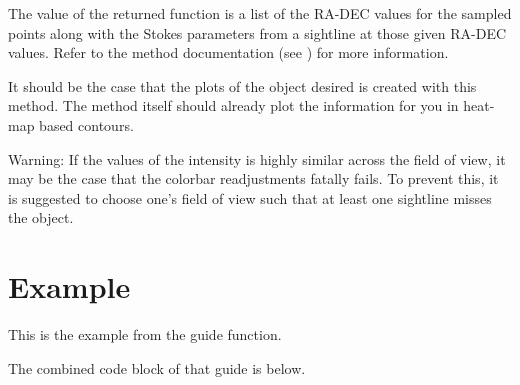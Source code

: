\documentclass[letterpaper,10pt,english]{sphinxmanual}
\begin{document}
The value of the returned function is a list of the RA-DEC values for the sampled points along with the Stokes parameters from a sightline at those given RA-DEC values. Refer to the method documentation (see {\hyperref[\detokenize{model_observing:model_observing.ObservingRun.Stokes_parameter_contours}]{}}) for more information.

It should be the case that the plots of the object desired is created with this method. The method itself should already plot the information for you in heat-map based contours.

Warning: If the values of the intensity is highly similar across the field of view, it may be the case that the colorbar readjustments fatally fails. To prevent this, it is suggested to choose one’s field of view such that at least one sightline misses the object.


\chapter{Example}
\label{\detokenize{example:example}}\label{\detokenize{example::doc}}
This is the example from the  guide function.

The combined code block of that guide is below.
\end{document}
